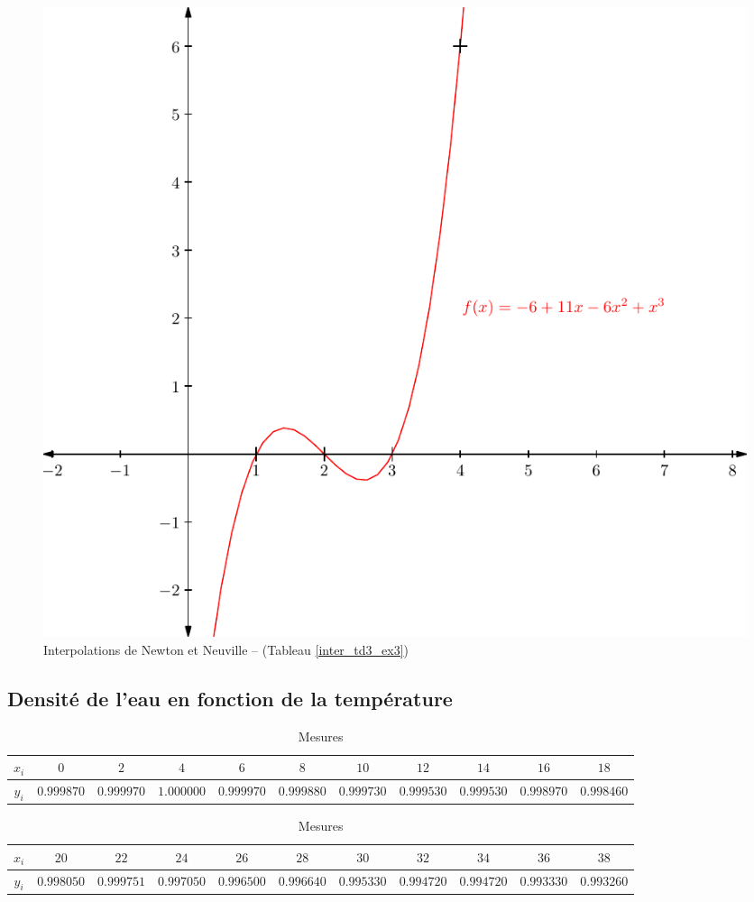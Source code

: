 \documentclass{report}
\begin{document}
	\begin{figure}[h]
	  \centering
	  \includegraphics[scale=0.7]{graphiques/pdf_output/inter_test1.pdf}
	  \caption{Interpolations de Newton et Neuville -- (Tableau \ref{inter_td3_ex3})}
	\end{figure}
      \newpage
      
      \subsection{Densité de l'eau en fonction de la température}      
	\begin{table}[h]
	  \centering
	  \begin{tabular}{| c | c | c | c | c | c | c | c | c | c | c |}
	    \hline 
	    $x_{i}$ & $0$ & $2$ & $4$ & $6$ & $8$ & $10$ & $12$ & $14$ & $16$ & $18$ \\
	    \hline 
	    $y_{i}$ & $0.999870$ & $0.999970$ & $1.000000$ & $0.999970$ & $0.999880$ & $0.999730$ & $0.999530$ & $0.999530$ & $0.998970$ & $0.998460$ \\ 
	    \hline 
	  \end{tabular}
	  \begin{tabular}{| c | c | c | c | c | c | c | c | c | c | c |}
	    \hline
	    $x_{i}$ & $20$ & $22$ & $24$ & $26$ & $28$ & $30$ & $32$ & $34$ & $36$ & $38$ \\ 
	    \hline
	    $y_{i}$ & $0.998050$ & $0.999751$ & $0.997050$ & $0.996500$ & $0.996640$ & $0.995330$ & $0.994720$ & $0.994720$ & $0.993330$ & $0.993260$ \\
	    \hline
	  \end{tabular}
	  \caption{Mesures}
	  \label{inter_tp2_ex1_densite}
	\end{table}
	
\end{document}
